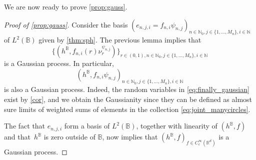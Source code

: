 \documentclass[JEP,XML,SOM,Unicode,published]{cedram}
\theoremstyle{definition}
\newcommand{\R}{\mathbb{R}}
\newcommand{\N}{\mathbb{N}}
\newcommand{\B}{\mathbb{B}}\let\D\B\let\Ub\B
\begin{document}
{We are now ready to prove \cref{prop:gauss}.}

\begin{proof}[Proof of \cref{prop:gauss}]

Consider the basis {$(e_{n,j,i} = f_{n,i}\psi_{n,j})_{n \in \N_0, j \in \{1, \dots, M_n\},i \in \N}$} of $L^2(\B)$ given by \cref{thm:sph}. The previous lemma implies that\vspace*{-3pt}
\begin{equation}\label{eq:joint_manycircles}
\{(h^\B, f_{n,i}(r)\nu_r^{\psi_{n,j}})\}_{r \in (0,1), n \in \N_0, j \in \{1, \dots, M_n\}, i \in \N}
\end{equation}
is a Gaussian process. In particular,\vspace*{-3pt}
\begin{equation}\label{eq:finally_gaussian}
{(h^\B,f_{n,i}\psi_{n,j})_{n \in \N_0, j \in \{1, \dots, M_n\}, i \in \N}}
\end{equation}
is also a Gaussian process. Indeed, the random variables in \eqref{eq:finally_gaussian} exist by \cref{cor}, and we obtain the Gaussianity since they can be defined as almost sure limits of weighted sums of elements in the collection \eqref{eq:joint_manycircles}.

The fact that $e_{n,j,i}$ form a basis of $L^2(\B)$, together with linearity of $(h^\B, f)$ and that~$h^\B$ is zero outside of $\B$, now implies that $(h^\B,f)_{f \in C_c^\infty(\R^d)}$ is a Gaussian process.
\end{proof}

\backmatter


\end{document}
